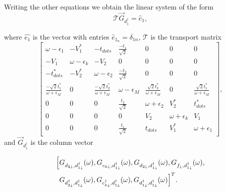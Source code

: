 \documentclass[showpacs,aps,prb,reprint,superscriptaddress]{revtex4-1}
\begin{document}
Writing the other equations  we obtain the  linear system of the form
\begin{equation}
    \mathcal{T} \vec{G}_{d^\dagger_1} = \hat{e}_1,
\end{equation}

\noindent where $\hat{e_1}$ is the vector with entries  $\hat{e}_{1_n} =\delta_{1n}$, $\mathcal{T}$ is the transport matrix 
\begin{equation}
\left[\begin{array}{ccccccc}
\omega-\epsilon_{1} & -V_{1}^{*} & -t_{dots} & \frac{-t_{1}}{\sqrt{2}} & 0 & 0 & 0\\
-V_{1} & \omega-\epsilon_{k} & -V_{2} & 0 & 0 & 0 & 0\\
-t_{dots}^{*} & -V_{2}^{*} & \omega-\epsilon_{2} & \frac{-t_{2}}{\sqrt{2}} & 0 & 0 & 0\\
\frac{-\sqrt{2}t_{1}^{*}}{\omega+\epsilon_{M}} & 0 & \frac{-\sqrt{2}t_{2}^{*}}{\omega+\epsilon_{M}} & \omega-\epsilon_{M} & \frac{\sqrt{2}t_{2}^{*}}{\omega+\epsilon_{M}} & 0 & \frac{\sqrt{2}t_{1}^{*}}{\omega+\epsilon_{M}}\\
0 & 0 & 0 & \frac{t_{2}}{\sqrt{2}} & \omega+\epsilon_{2} & V_{2}^{*} & t_{dots}^{*}\\
0 & 0 & 0 & 0 & V_{2} & \omega+\epsilon_{k} & V_{1}\\
0 & 0 & 0 & \frac{t_{1}}{\sqrt{2}} & t_{dots} & V_{1}^{*} & \omega+\epsilon_{1}
\end{array}\right],
\label{eq:TransportMatrix}
\end{equation}
 \noindent and $\vec{G}_{d^\dagger_1}$  is the column vector
 
 \begin{align*}
    \Big[ &  G_{d_{\mathbf{1\downarrow}},d_{1\downarrow}^{\dagger}}(\omega),G_{c_{k\downarrow},d_{1\downarrow}^{\dagger}}(\omega),G_{d_{2\downarrow},d_{1\downarrow}^{\dagger}}(\omega),G_{f_{\downarrow},  d_{1\downarrow}^{\dagger}}(\omega), \\ & G_{d_{2\downarrow}^{\dagger},d_{1\downarrow}^{\dagger}}(\omega),G_{c_{k\downarrow}^{\dagger},d_{1\downarrow}^{\dagger}}(\omega),G_{d_{1\downarrow}^{\dagger},d_{1\downarrow}^{\dagger}}(\omega) \Big]^T.
 \end{align*}
 
\end{document}
